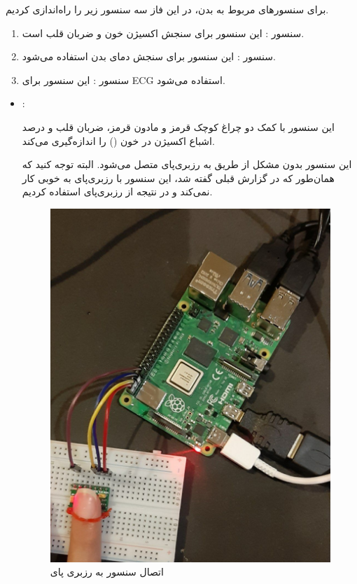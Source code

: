 \documentclass[12pt]{article}
\begin{document}
برای سنسورهای مربوط به بدن، در این فاز سه سنسور زیر را راه‌اندازی کردیم.

\begin{enumerate}
	\item 
	سنسور : این سنسور برای سنجش اکسیژن خون و ضربان قلب است.
	
	\item 
	سنسور : این سنسور برای سنجش دمای بدن استفاده می‌شود.
	
	\item 
	سنسور : این سنسور برای ECG استفاده می‌شود.
	
	
	
\end{enumerate}





\begin{itemize}
	\item {}:
	
این سنسور با کمک دو چراغ کوچک قرمز و مادون قرمز، ضربان قلب و درصد اشباع اکسیژن در خون () را اندازه‌گیری می‌کند.

این سنسور بدون مشکل از طریق  به رزبری‌پای متصل می‌شود. البته توجه کنید که همان‌طور که در گزارش قبلی گفته شد، این سنسور با رزبری‌پای  به خوبی کار نمی‌کند و در نتیجه از رزبری‌پای  استفاده کردیم. 

	\begin{figure}[H]
		\begin{center}
			\includegraphics[width=.60\textwidth]{images/max30102-1.jpg}
		\end{center}
		\caption{اتصال سنسور   به رزبری پای}
	\end{figure}


\end{itemize}
\end{document}
